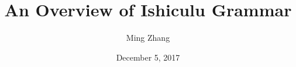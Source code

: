 \documentclass{beamer}
\title{An Overview of Ishiculu Grammar}
\author{Ming Zhang}
\institute[University of Pennsylvania] %
\date{December 5, 2017}
\begin{document}
\begin{frame}
  \titlepage
\end{frame}



\end{document}
